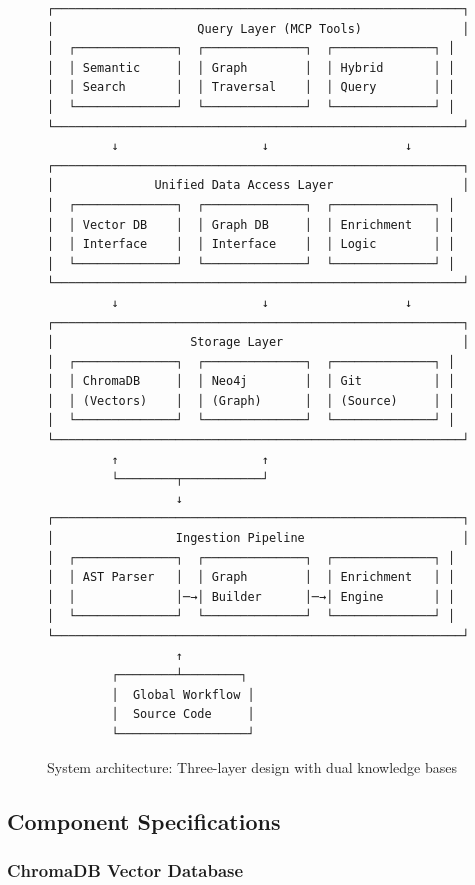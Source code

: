 \documentclass[11pt,letterpaper]{article}
\begin{document}
\begin{figure}[h]
\centering
\begin{verbatim}
┌─────────────────────────────────────────────────────────┐
│                    Query Layer (MCP Tools)              │
│  ┌──────────────┐  ┌──────────────┐  ┌──────────────┐ │
│  │ Semantic     │  │ Graph        │  │ Hybrid       │ │
│  │ Search       │  │ Traversal    │  │ Query        │ │
│  └──────────────┘  └──────────────┘  └──────────────┘ │
└─────────────────────────────────────────────────────────┘
         ↓                    ↓                   ↓
┌─────────────────────────────────────────────────────────┐
│              Unified Data Access Layer                  │
│  ┌──────────────┐  ┌──────────────┐  ┌──────────────┐ │
│  │ Vector DB    │  │ Graph DB     │  │ Enrichment   │ │
│  │ Interface    │  │ Interface    │  │ Logic        │ │
│  └──────────────┘  └──────────────┘  └──────────────┘ │
└─────────────────────────────────────────────────────────┘
         ↓                    ↓                   ↓
┌─────────────────────────────────────────────────────────┐
│                   Storage Layer                         │
│  ┌──────────────┐  ┌──────────────┐  ┌──────────────┐ │
│  │ ChromaDB     │  │ Neo4j        │  │ Git          │ │
│  │ (Vectors)    │  │ (Graph)      │  │ (Source)     │ │
│  └──────────────┘  └──────────────┘  └──────────────┘ │
└─────────────────────────────────────────────────────────┘
         ↑                    ↑
         └────────┬───────────┘
                  ↓
┌─────────────────────────────────────────────────────────┐
│                 Ingestion Pipeline                      │
│  ┌──────────────┐  ┌──────────────┐  ┌──────────────┐ │
│  │ AST Parser   │  │ Graph        │  │ Enrichment   │ │
│  │              │─→│ Builder      │─→│ Engine       │ │
│  └──────────────┘  └──────────────┘  └──────────────┘ │
└─────────────────────────────────────────────────────────┘
                  ↑
         ┌────────┴────────┐
         │  Global Workflow │
         │  Source Code     │
         └──────────────────┘
\end{verbatim}
\caption{System architecture: Three-layer design with dual knowledge bases}
\label{fig:architecture}
\end{figure}

\subsection{Component Specifications}

\subsubsection{ChromaDB Vector Database}
\end{document}
